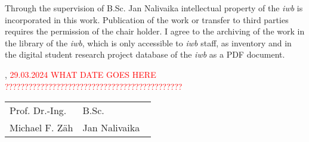 Through the supervision of B.Sc. Jan Nalivaika intellectual property of the \textit{iwb} is incorporated in this work. Publication of the work or transfer to third parties requires the permission of the chair holder. I agree to the archiving of the work in the library of the \textit{iwb}, which is only accessible to \textit{iwb} staff, as inventory and in the digital student research project database of the \textit{iwb} as a PDF document.
\vfill

\IWBaddressCityChair, \textcolor{red}{29.03.2024 WHAT DATE GOES HERE ?????????????????????????????????????????????}
\vspace{2.5cm}\\
\begin{tabular}{p{0.5\linewidth}p{0.5\linewidth} }
	Prof. Dr.-Ing.		& B.Sc.\\
Michael F. Zäh  	& Jan Nalivaika
\end{tabular}
